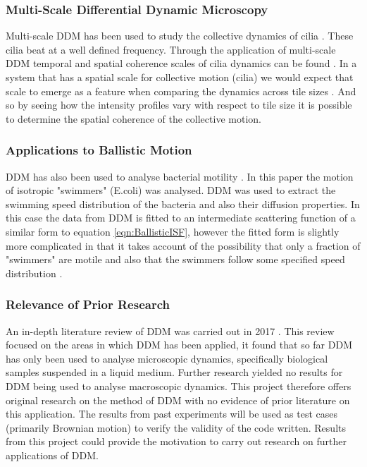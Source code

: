 \documentclass[10pt]{article}
\begin{document}
\subsubsection{Multi-Scale Differential Dynamic Microscopy}
Multi-scale DDM has been used to study the collective dynamics of cilia \cite{ddm2}. These cilia beat at a well defined frequency. Through the application of multi-scale DDM temporal and spatial coherence scales of cilia dynamics can be found \cite{ddm1}. In a system that has a spatial scale for collective motion (cilia) we would expect that scale to emerge as a feature when comparing the dynamics across tile sizes \cite{ddm1}. And so by seeing how the intensity profiles vary with respect to tile size it is possible to determine the spatial coherence of the collective motion.

\subsubsection{Applications to Ballistic Motion}
DDM has also been used to analyse bacterial motility \cite{bacterial_motility}. In this paper the motion of isotropic "swimmers" (E.coli) was analysed. DDM was used to extract the swimming speed distribution of the bacteria and also their diffusion properties. In this case the data from DDM is fitted to an intermediate scattering function of a similar form to equation \ref{eqn:BallisticISF}, however the fitted form is slightly more complicated in that it takes account of the possibility that only a fraction of "swimmers" are motile and also that the swimmers follow some specified speed distribution \cite{bacterial_motility}.

\subsubsection{Relevance of Prior Research}
An in-depth literature review of DDM was carried out in 2017 \cite{ddm1}. This review focused on the areas in which DDM has been applied, it found that so far DDM has only been used to analyse microscopic dynamics, specifically biological samples suspended in a liquid medium. Further research yielded no results for DDM being used to analyse macroscopic dynamics. This project therefore offers original research on the method of DDM with no evidence of prior literature on this application. The results from past experiments will be used as test cases (primarily Brownian motion) to verify the validity of the code written. Results from this project could provide the motivation to carry out research on further applications of DDM.
\end{document}

